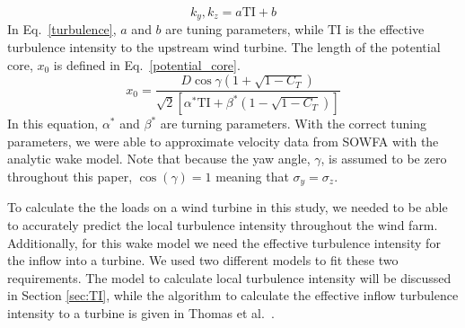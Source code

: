 \documentclass[11pt,letterpaper]{article}
\begin{document}
%
\begin{equation}
    \label{turbulence}
    k_y,k_z = a\text{TI}+b
\end{equation}
%
In Eq.~\ref{turbulence}, $a$ and $b$ are tuning parameters, while $\text{TI}$ is the effective turbulence intensity to the upstream wind turbine. 
The length of the potential core, $x_0$ is defined in Eq.~\ref{potential_core}.
%
\begin{equation}
    \label{potential_core}
    x_0 = \frac{D \cos{\gamma} (1 + \sqrt{1-C_T})}{\sqrt{2}[\alpha^*\text{TI} + \beta^* (1-\sqrt{1-C_T})]}
\end{equation}
% 
In this equation, $\alpha^*$ and $\beta^*$ are turning parameters.
With the correct tuning parameters, we were able to approximate velocity data from SOWFA with the analytic wake model. 
% 
Note that because the yaw angle, $\gamma$, is assumed to be zero throughout this paper, $\cos(\gamma)=1$ meaning that $\sigma_y=\sigma_z$. 

To calculate the the loads on a wind turbine in this study, we needed to be able to accurately predict the local turbulence intensity throughout the wind farm. Additionally, for this wake model we need the effective turbulence intensity for the inflow into a turbine. We used two different models to fit these two requirements. The model to calculate local turbulence intensity will be discussed in Section \ref{sec:TI}, while the algorithm to calculate the effective inflow turbulence intensity to a turbine is given in Thomas et al.~\cite{Thomas2019}.
\end{document}

